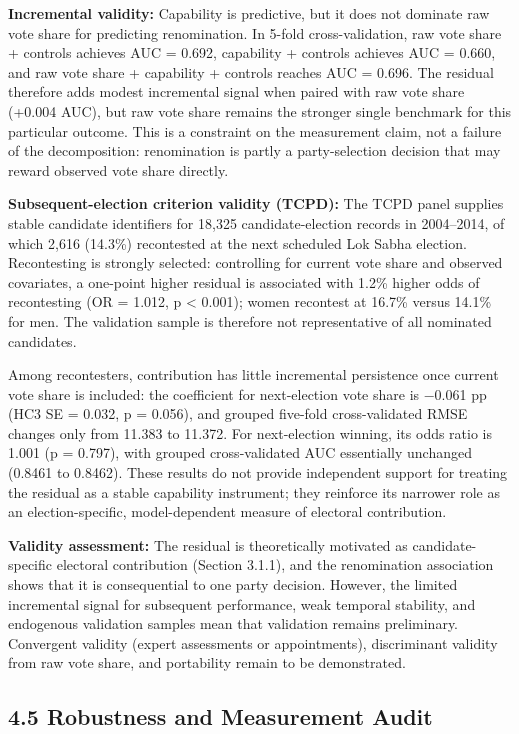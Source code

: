 \documentclass[
]{article}
\begin{document}
\textbf{Incremental validity:} Capability is predictive, but it does not dominate raw vote share for predicting renomination. In 5-fold cross-validation, raw vote share + controls achieves AUC = 0.692, capability + controls achieves AUC = 0.660, and raw vote share + capability + controls reaches AUC = 0.696. The residual therefore adds modest incremental signal when paired with raw vote share (+0.004 AUC), but raw vote share remains the stronger single benchmark for this particular outcome. This is a constraint on the measurement claim, not a failure of the decomposition: renomination is partly a party-selection decision that may reward observed vote share directly.

\textbf{Subsequent-election criterion validity (TCPD):} The TCPD panel supplies stable candidate identifiers for 18,325 candidate-election records in 2004--2014, of which 2,616 (14.3\%) recontested at the next scheduled Lok Sabha election. Recontesting is strongly selected: controlling for current vote share and observed covariates, a one-point higher residual is associated with 1.2\% higher odds of recontesting (OR = 1.012, p \textless{} 0.001); women recontest at 16.7\% versus 14.1\% for men. The validation sample is therefore not representative of all nominated candidates.

Among recontesters, contribution has little incremental persistence once current vote share is included: the coefficient for next-election vote share is $-$0.061 pp (HC3 SE = 0.032, p = 0.056), and grouped five-fold cross-validated RMSE changes only from 11.383 to 11.372. For next-election winning, its odds ratio is 1.001 (p = 0.797), with grouped cross-validated AUC essentially unchanged (0.8461 to 0.8462). These results do not provide independent support for treating the residual as a stable capability instrument; they reinforce its narrower role as an election-specific, model-dependent measure of electoral contribution.

\textbf{Validity assessment:} The residual is theoretically motivated as candidate-specific electoral contribution (Section 3.1.1), and the renomination association shows that it is consequential to one party decision. However, the limited incremental signal for subsequent performance, weak temporal stability, and endogenous validation samples mean that validation remains preliminary. Convergent validity (expert assessments or appointments), discriminant validity from raw vote share, and portability remain to be demonstrated.

\subsection{4.5 Robustness and Measurement Audit}\label{45-robustness-and-measurement-audit}
\end{document}
